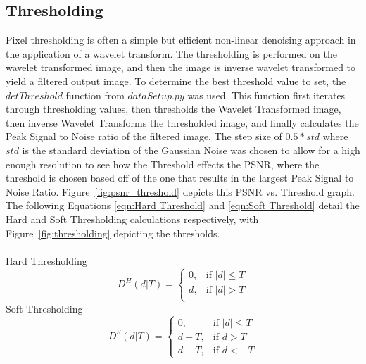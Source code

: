 \documentclass{article}\raggedbottom
\begin{document}
\subsection{Thresholding}
Pixel thresholding is often a simple but efficient non-linear denoising approach in the application of a wavelet transform. The thresholding is performed on the wavelet transformed image, and then the image is inverse wavelet transformed to yield a filtered output image. To determine the best threshold value to set, the $detThreshold$ function from $dataSetup.py$ was used. This function first iterates through thresholding values, then thresholds the Wavelet Transformed image, then inverse Wavelet Transforms the thresholded image, and finally calculates the Peak Signal to Noise ratio of the filtered image. The step size of $0.5*std$ where $std$ is the standard deviation of the Gaussian Noise was chosen to allow for a high enough resolution to see how the Threshold effects the PSNR, where the threshold is chosen based off of the one that results in the largest Peak Signal to Noise Ratio. Figure~\ref{fig:psnr_threshold} depicts this PSNR vs. Threshold graph. The following Equations \eqref{eqn:Hard Threshold} and \eqref{eqn:Soft Threshold} detail the Hard and Soft Thresholding calculations respectively, with Figure~\ref{fig:thresholding} depicting the thresholds.
\\\\
Hard Thresholding   
\begin{equation}\label{eqn:Hard Threshold}
D^H(d|T) =
\begin{cases}
0, & \text{if $|d| \leq T$} \\
d, & \text{if $|d| > T$} \\
\end{cases}
\end{equation}	
Soft Thresholding
\begin{equation}\label{eqn:Soft Threshold}
D^S(d|T) =
\begin{cases}
0, & \text{if $|d| \leq T$} \\
d-T, & \text{if $d > T$} \\
d+T, & \text{if $d < -T$}
\end{cases}
\end{equation} 
\end{document}
